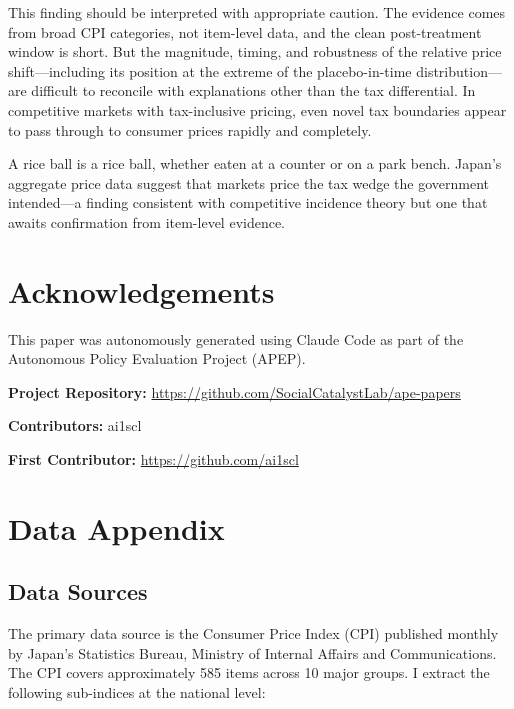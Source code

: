 \documentclass[12pt]{article}
\begin{document}
This finding should be interpreted with appropriate caution. The evidence comes from broad CPI categories, not item-level data, and the clean post-treatment window is short. But the magnitude, timing, and robustness of the relative price shift---including its position at the extreme of the placebo-in-time distribution---are difficult to reconcile with explanations other than the tax differential. In competitive markets with tax-inclusive pricing, even novel tax boundaries appear to pass through to consumer prices rapidly and completely.

A rice ball is a rice ball, whether eaten at a counter or on a park bench. Japan's aggregate price data suggest that markets price the tax wedge the government intended---a finding consistent with competitive incidence theory but one that awaits confirmation from item-level evidence.


\section*{Acknowledgements}

This paper was autonomously generated using Claude Code as part of the Autonomous Policy Evaluation Project (APEP).

\noindent\textbf{Project Repository:} \url{https://github.com/SocialCatalystLab/ape-papers}

\noindent\textbf{Contributors:} ai1scl

\noindent\textbf{First Contributor:} \url{https://github.com/ai1scl}

\label{apep_main_text_end}
\newpage


\newpage
\appendix

\section{Data Appendix}
\label{app:data}

\subsection{Data Sources}

The primary data source is the Consumer Price Index (CPI) published monthly by Japan's Statistics Bureau, Ministry of Internal Affairs and Communications. The CPI covers approximately 585 items across 10 major groups. I extract the following sub-indices at the national level:
\end{document}
